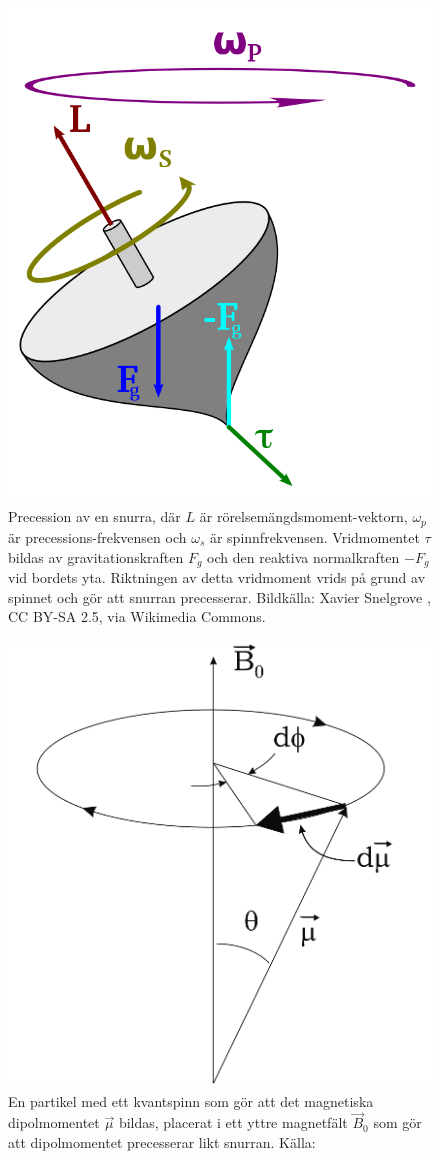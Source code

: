 \documentclass[11pt, a4paper]{article}
\begin{document}
\begin{figure}[p]
	\centering
	\includegraphics[width=.5\textwidth]{snurra_precession}
	\caption{Precession av en snurra, där $L$ är rörelsemängdsmoment-vektorn, $\omega_p$ är precessions-frekvensen och $\omega_s$ är spinnfrekvensen. Vridmomentet $\tau$ bildas av gravitationskraften $F_g$ och den reaktiva normalkraften $-F_g$ vid bordets yta. Riktningen av detta vridmoment vrids på grund av spinnet och gör att snurran precesserar. Bildkälla: Xavier Snelgrove \parencite*{fig:snurra_precession}, CC BY-SA 2.5, via Wikimedia Commons.}
	\label{fig:snurra_precession}
\end{figure}
\begin{figure}[p]
	\centering
	\includegraphics[width=.5\textwidth]{magnetic_moment_precession}
	\caption{En partikel med ett kvantspinn som gör att det magnetiska dipolmomentet $\vec\mu$ bildas, placerat i ett yttre magnetfält $\vec B_0$ som gör att dipolmomentet precesserar likt snurran. Källa: \cite{mri_lärobok}}
	\label{fig:magnetiskt_moment_precession}
\end{figure}
\end{document}

